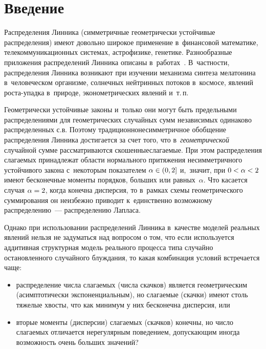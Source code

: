\begin{multicols}{2}

\label{st\stat}

\section{Введение}

Распределения Линника (симметричные гео\-мет\-ри\-чески устойчивые
распределения) имеют доволь\-но широкое применение в~финансовой
математике, телекоммуникационных системах, астрофизике, генетике.
Разнообразные приложения распределений Линника описаны 
в~работах~\cite{MittnikRachev1991, Kotz2001}. В~частности, распределения
Линника возникают при изучении механизма синтеза мелатонина 
в~человеческом организме, солнечных нейтринных потоков в~космосе,
явлений рос\-та-упад\-ка в~природе, эконометрических явлений и~т.\,п.

Геометрически устойчивые законы и~только они могут быть предельными
распределениями для геометрических случайных сумм независимых
одинаково распределенных с.в. Поэтому
традиционно\linebreak несимметричное обобщение распределения Линника
достигается за счет того, что в~\textit{геометрической} случайной сумме
рассматриваются скошенные\linebreak слагаемые. При этом распределения
слагаемых принадлежат области нормального притяжения несимметричного
устойчивого закона с~некоторым показателем $\alpha\hm\in(0,2]$ и,~значит, 
при $0\hm<\alpha\hm<2$ имеют бесконечные моменты порядков, больших
или равных~$\alpha$. Что касается случая $\alpha\hm=2$, когда конечна
дисперсия, то в~рамках схемы гео\-мет\-ри\-че\-ско\-го суммирования он
неизбежно приводит к~единственно возможному распределению~---
распределению Лап\-ласа.

Однако при использовании распределений Линника в~качестве моделей
реальных явлений нельзя не задуматься над вопросом о том, что если
используется аддитивная структурная модель реального процесса типа
случайно остановленного случайного блуждания, то какая комбинация
условий встречается чаще:
\begin{itemize}
\item распределение числа слагаемых (числа скачков) является геометрическим
(асимптотически экспоненциальным), но слагаемые \mbox{(скачки)} имеют столь
тяжелые хвосты, что как минимум у них бесконечна дисперсия, или

\item вторые моменты (дисперсии) слагаемых (скачков) конечны, но
число слагаемых отличается нерегулярным поведением, допускающим
иногда возможность очень больших значений?
\end{itemize}


\end{multicols}
